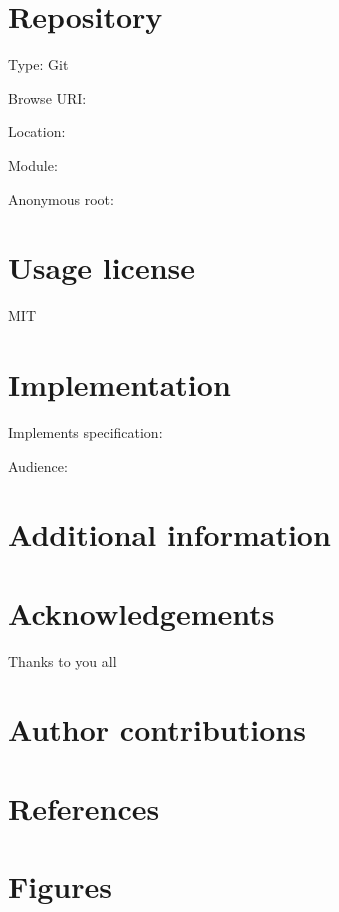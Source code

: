 \documentclass[
]{article}
\begin{document}
\hypertarget{repository}{%
\section{Repository}\label{repository}}

Type: Git

Browse URI:

Location:

Module:

Anonymous root:

\hypertarget{usage-license}{%
\section{Usage license}\label{usage-license}}

MIT

\hypertarget{implementation}{%
\section{Implementation}\label{implementation}}

Implements specification:

Audience:

\hypertarget{additional-information}{%
\section{Additional information}\label{additional-information}}

\hypertarget{acknowledgements}{%
\section{Acknowledgements}\label{acknowledgements}}

Thanks to you all

\hypertarget{author-contributions}{%
\section{Author contributions}\label{author-contributions}}

\hypertarget{references}{%
\section{References}\label{references}}

\hypertarget{figures}{%
\section{Figures}\label{figures}}
\end{document}
